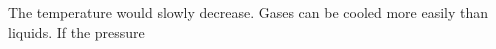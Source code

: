 The temperature would slowly decrease.  
Gases can be cooled more easily than liquids.  
If the pressure